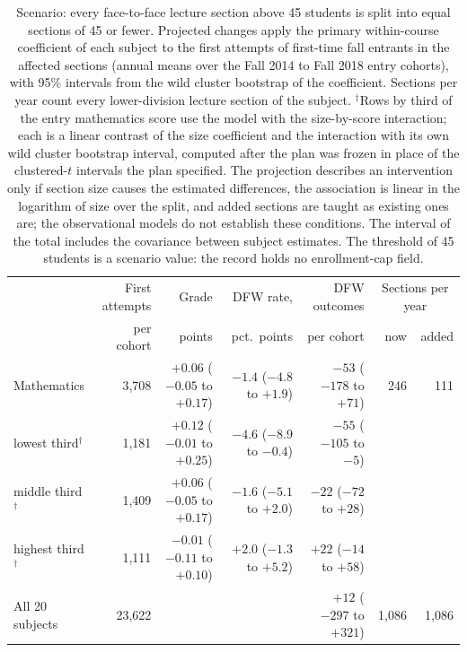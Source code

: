 \begin{table}[tbp]
  \centering
  \caption{Scenario: every face-to-face lecture section above
    45 students is split into equal sections of
    45 or fewer. Projected changes apply the primary
    within-course coefficient of each subject to the first attempts
    of first-time fall entrants in the affected sections (annual
    means over the Fall 2014 to Fall
    2018 entry cohorts), with 95\% intervals from
    the wild cluster bootstrap of the coefficient. Sections per
    year count every lower-division lecture section of the
    subject.
    $^\dagger$Rows by third of the entry mathematics score use
    the model with the size-by-score interaction; each is a
    linear contrast of the size coefficient and the interaction
    with its own wild cluster bootstrap interval, computed after
    the plan was frozen in place of the clustered-$t$ intervals
    the plan specified. The projection describes an intervention
    only if section size causes the estimated differences, the
    association is linear in the logarithm of size over the
    split, and added sections are taught as existing ones are;
    the observational models do not establish these conditions.
    The interval of the total includes the covariance between
    subject estimates. The threshold of
    45 students is a scenario value: the record holds
    no enrollment-cap field.}
  \label{tab:classsizescenario}
  \footnotesize
  \setlength{\tabcolsep}{2.5pt}
  \begin{tabular}{lrrrrrr}
    \toprule
    & First attempts & Grade & DFW rate, & DFW outcomes & \multicolumn{2}{c}{Sections per year} \\
    & per cohort & points & pct.\ points & per cohort & now & added \\
    \midrule
    Mathematics & 3,708 & $+0.06$ {\scriptsize($-0.05$ to $+0.17$)} & $-1.4$ {\scriptsize($-4.8$ to $+1.9$)} & $-53$ {\scriptsize($-178$ to $+71$)} & 246 & 111 \\
    \quad lowest third$^\dagger$ & 1,181 & $+0.12$ {\scriptsize($-0.01$ to $+0.25$)} & $-4.6$ {\scriptsize($-8.9$ to $-0.4$)} & $-55$ {\scriptsize($-105$ to $-5$)} & & \\
    \quad middle third$^\dagger$ & 1,409 & $+0.06$ {\scriptsize($-0.05$ to $+0.17$)} & $-1.6$ {\scriptsize($-5.1$ to $+2.0$)} & $-22$ {\scriptsize($-72$ to $+28$)} & & \\
    \quad highest third$^\dagger$ & 1,111 & $-0.01$ {\scriptsize($-0.11$ to $+0.10$)} & $+2.0$ {\scriptsize($-1.3$ to $+5.2$)} & $+22$ {\scriptsize($-14$ to $+58$)} & & \\
    \midrule
    All 20 subjects & 23,622 & & & $+12$ {\scriptsize($-297$ to $+321$)} & 1,086 & 1,086 \\
    \bottomrule
  \end{tabular}
\end{table}
